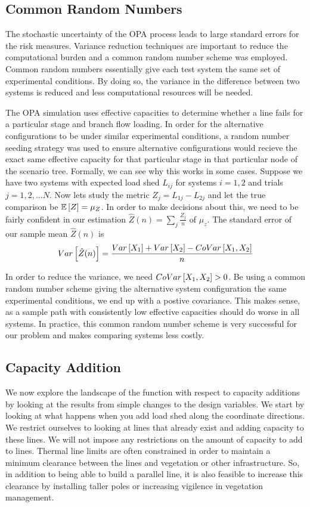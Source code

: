 \subsection{Common Random Numbers}
The stochastic uncertainty of the OPA process leads to large standard errors for the risk measures.  Variance reduction techniques are important to reduce the computational burden and a common random number scheme was employed.  Common random numbers essentially give each test system the same set of experimental conditions.  By doing so, the variance in the difference between two systems is reduced and less computational resources will be needed. \cite{law_2007}

The OPA simulation uses effective capacities to determine whether a line fails for a particular stage and branch flow loading.  In order for the alternative configurations to be under similar experimental conditions, a random number seeding strategy was used to ensure alternative configurations would recieve the exact same effective capacity for that particular stage in that particular node of the scenario tree.   Formally, we can see why this works in some cases.  Suppose we have two systems with expected load shed $L_{ij}$ for systems $i=1,2$ and trials $j=1,2,...N$.  Now lets study the metric $Z_j = L_{1j} - L_{2j}$ and let the true comparison be $\mathbb{E}\left[ Z \right]=\mu_Z$.  In order to make decisions about this, we need to be fairly confident in our estimation $\hat{Z}(n)=\sum_j \frac{Z_j}{n}$ of $\mu_z$.  The standard error of our sample mean $\hat{Z}(n)$ is
\begin{equation}
Var\left[  \hat{Z}(n)  \right] = \frac{ Var\left[ X_1 \right] + Var\left[ X_2 \right] - CoVar\left[ X_1, X_2 \right] }{n}
\end{equation}

In order to reduce the variance, we need $CoVar\left[ X_1, X_2 \right]>0$.  Be using a common random number scheme giving the alternative system configuration the same experimental conditions, we end up with a postive covariance.  This makes sense, as a sample path with consistently low effective capacities should do worse in all systems.  In practice, this common random number scheme is very successful for our problem and makes comparing systems less costly.


\subsection{Capacity Addition}
We now explore the landscape of the function with respect to capacity additions by looking at the results from simple changes to the design variables.  We start by looking at what happens when you add load shed along the coordinate directions.  We restrict ourselves to looking at lines that already exist and adding capacity to these lines.  We will not impose any restrictions on the amount of capacity to add to lines.  Thermal line limits are often constrained in order to maintain a minimum clearance between the lines and vegetation or other infrastructure.  So, in addition to being able to build a parallel line, it is also feasible to increase this clearance by installing taller poles or increasing vigilence in vegetation management.

